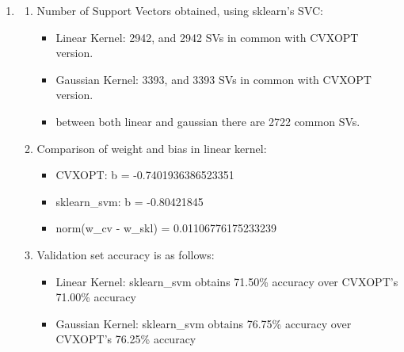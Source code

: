 \documentclass[12pt]{article}
\begin{document}
\begin{enumerate}[label=(\alph*)]
    \item \begin{enumerate}[label=\roman*.]
              \item Number of Support Vectors obtained, using sklearn's SVC:
                    \begin{itemize}
                        \item Linear Kernel: 2942, and 2942 SVs in common with CVXOPT version.
                        \item Gaussian Kernel: 3393, and 3393 SVs in common with CVXOPT version.
                        \item between both linear and gaussian there are 2722 common SVs.
                    \end{itemize}

              \item Comparison of weight and bias in linear kernel:
                    \begin{itemize}
                        \item CVXOPT: b = -0.7401936386523351
                        \item sklearn\_svm: b = -0.80421845
                        \item norm(w\_cv - w\_skl) = 0.01106776175233239
                    \end{itemize}
              \item Validation set accuracy is as follows:
                    \begin{itemize}
                        \item Linear Kernel: sklearn\_svm obtains 71.50\% accuracy over CVXOPT's 71.00\% accuracy
                        \item Gaussian Kernel: sklearn\_svm obtains 76.75\% accuracy over CVXOPT's 76.25\% accuracy
                    \end{itemize}


\end{enumerate}
\end{enumerate}
\end{document}
